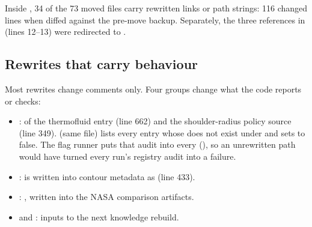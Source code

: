 Inside , 34 of the 73 moved files carry rewritten links or path strings: 116 changed lines when diffed against the pre-move backup. Separately, the three  references in  (lines 12--13) were redirected to .

\subsection{Rewrites that carry behaviour}
Most rewrites change comments only. Four groups change what the code reports or checks:
\begin{itemize}
  \item {}:  of the thermofluid entry (line 662) and the shoulder-radius policy source (line 349).  (same file) lists every entry whose  does not exist under  and sets  to false. The flag runner puts that audit into every  (), so an unrewritten path would have turned every run's registry audit into a failure.
  \item {}:  is written into contour metadata as  (line 433).
  \item {}: , written into the NASA comparison artifacts.
  \item {} and : inputs to the next knowledge rebuild.
\end{itemize}

